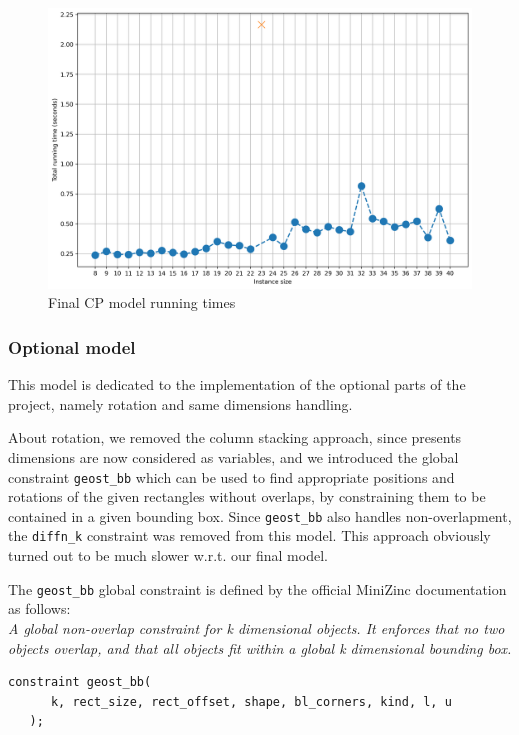 \documentclass[a4paper,10pt]{article}
\begin{document}
\begin{figure}[H]
   \centering
   \includegraphics[scale=0.45]{cp-times.png}
   \caption{Final CP model running times}
\end{figure}

\subsubsection{Optional model}
This model is dedicated to the implementation of the optional parts of the project, namely rotation and same dimensions handling.

About rotation, we removed the column stacking approach, since presents dimensions are now considered as variables, and we introduced the global constraint \texttt{geost\_bb} which can be used to find appropriate positions and rotations of the given rectangles without overlaps, by constraining them to be contained in a given bounding box. Since \texttt{geost\_bb} also handles non-overlapment, the \texttt{diffn\_k} constraint was removed from this model. This approach obviously turned out to be much slower w.r.t. our final model.

The \texttt{geost\_bb} global constraint is defined by the official MiniZinc documentation \cite{minizinc} as follows: \\
\emph{A global non-overlap constraint for k dimensional objects. It enforces that no two objects overlap, and that all objects fit within a global k dimensional bounding box.}

\begin{Verbatim}[samepage=true]
   constraint geost_bb(
      k, rect_size, rect_offset, shape, bl_corners, kind, l, u
   );
\end{Verbatim}
\end{document}

